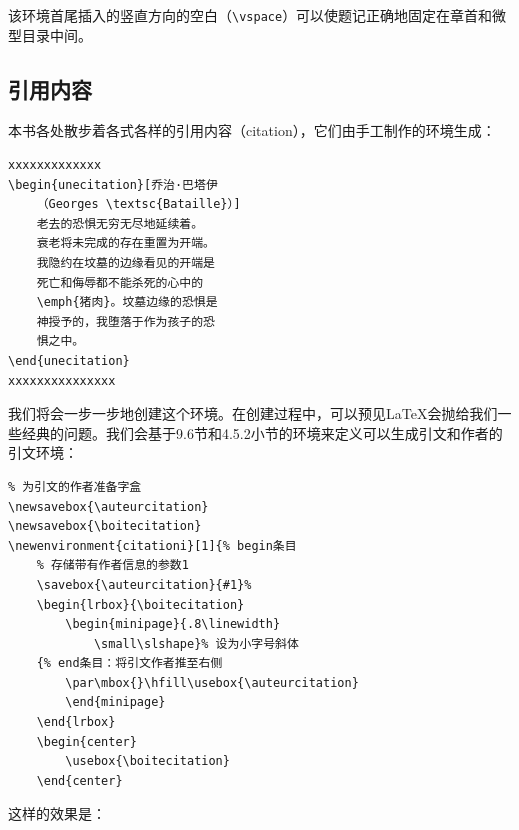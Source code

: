 该环境首尾插入的竖直方向的空白（\verb|\vspace|）可以使题记正确地固定在章首和微型目录中间。

\subsection{引用内容}

本书各处散步着各式各样的引用内容（citation），它们由手工制作的环境生成：

\begin{codelist}[11.12]{
}\begin{verbatim}
xxxxxxxxxxxxx
\begin{unecitation}[乔治·巴塔伊
    （Georges \textsc{Bataille}）]
    老去的恐惧无穷无尽地延续着。
    衰老将未完成的存在重置为开端。
    我隐约在坟墓的边缘看见的开端是
    死亡和侮辱都不能杀死的心中的
    \emph{猪肉}。坟墓边缘的恐惧是
    神授予的，我堕落于作为孩子的恐
    惧之中。
\end{unecitation}
xxxxxxxxxxxxxxx
\end{verbatim}
\end{codelist}

我们将会一步一步地创建这个环境。在创建过程中，可以预见\LaTeX 会抛给我们一些经典的问题。我们会基于9.6节和4.5.2小节的环境来定义可以生成引文和作者的引文环境：

\begin{dmd}
\begin{verbatim}
% 为引文的作者准备字盒
\newsavebox{\auteurcitation} 
\newsavebox{\boitecitation}
\newenvironment{citationi}[1]{% begin条目
    % 存储带有作者信息的参数1
    \savebox{\auteurcitation}{#1}% 
    \begin{lrbox}{\boitecitation}
        \begin{minipage}{.8\linewidth} 
            \small\slshape}% 设为小字号斜体
    {% end条目：将引文作者推至右侧
        \par\mbox{}\hfill\usebox{\auteurcitation} 
        \end{minipage}
    \end{lrbox}
    \begin{center}
        \usebox{\boitecitation}
    \end{center}
\end{verbatim}
\end{dmd}

这样的效果是：

\newsavebox{\auteurcitation} 
\newsavebox{\boitecitation}
\newenvironment{citationi}[1]{%
    \savebox{\auteurcitation}{#1}%
    \begin{lrbox}{\boitecitation}
        \begin{minipage}{.8\linewidth} 
            \small\slshape}%
    {%
        \par\mbox{}\hfill\usebox{\auteurcitation} 
        \end{minipage}
    \end{lrbox}
    \begin{center}
        \usebox{\boitecitation}
    \end{center}}

